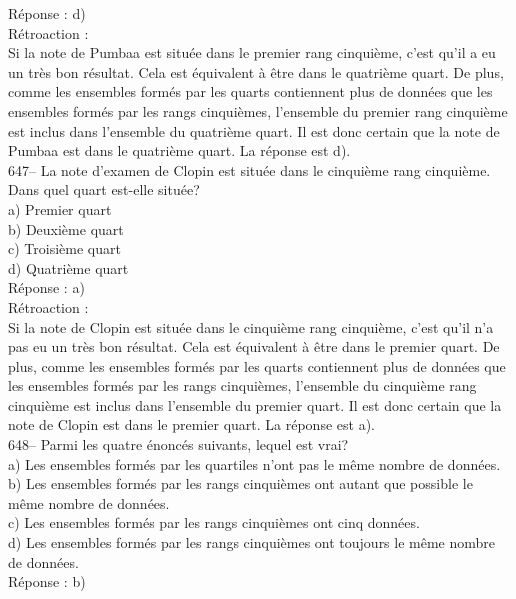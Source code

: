 ﻿\documentclass[letterpaper, 12pt]{article}
\begin{document}
R\'eponse : d)\\

R\'etroaction : \\
Si la note de Pumbaa est situ\'ee dans le premier rang cinqui\`eme, c'est
qu'il a eu un tr\`es bon r\'esultat.  Cela est \'equivalent \`a \^etre dans
le quatri\`eme quart.  De plus, comme les ensembles form\'es par les quarts
contiennent plus de donn\'ees que les ensembles form\'es par les rangs
cinqui\`emes, l'ensemble du premier rang cinqui\`eme est inclus dans
l'ensemble du quatri\`eme quart.  Il est donc certain que la note de Pumbaa
est dans le quatri\`eme quart.  La r\'eponse est d).\\

647-- La note d'examen de Clopin est situ\'ee dans le cinqui\`eme rang
cinqui\`eme.  Dans quel quart est-elle situ\'ee?\\
a) Premier quart\\
b) Deuxi\`eme quart\\
c) Troisi\`eme quart\\
d) Quatri\`eme quart\\

R\'eponse : a)\\

R\'etroaction : \\
Si la note de Clopin est situ\'ee dans le cinqui\`eme rang cinqui\`eme,
c'est qu'il n'a pas eu un tr\`es bon r\'esultat.  Cela est \'equivalent \`a
\^etre dans le premier quart.  De plus, comme les ensembles form\'es par les
quarts contiennent plus de donn\'ees que les ensembles form\'es par les
rangs cinqui\`emes, l'ensemble du cinqui\`eme rang cinqui\`eme est inclus
dans l'ensemble du premier quart.  Il est donc certain que la note de Clopin
est dans le premier quart.  La r\'eponse est a).\\

648-- Parmi les quatre \'enonc\'es suivants, lequel est vrai?\\
a) Les ensembles form\'es par les quartiles n'ont pas le m\^eme nombre de
donn\'ees.\\
b) Les ensembles form\'es par les rangs cinqui\`emes ont autant que possible
le m\^eme nombre de donn\'ees.\\
c) Les ensembles form\'es par les rangs cinqui\`emes ont cinq donn\'ees.\\
d) Les ensembles form\'es par les rangs cinqui\`emes ont toujours le m\^eme
nombre de donn\'ees.\\

R\'eponse : b)\\
\end{document}
